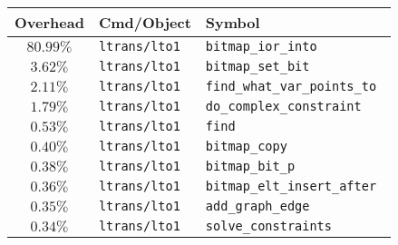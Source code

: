 \begin{tabular}{|c|l|l|}\hline Overhead & Cmd/Object & Symbol \\  \hline
\hline $80.99\%$ & \tt ltrans\hfill/lto1 & \tt bitmap\_ior\_into \\
\hline $3.62\%$ & \tt ltrans\hfill/lto1 & \tt bitmap\_set\_bit \\
\hline $2.11\%$ & \tt ltrans\hfill/lto1 & \tt find\_what\_var\_points\_to \\
\hline $1.79\%$ & \tt ltrans\hfill/lto1 & \tt do\_complex\_constraint \\
\hline $0.53\%$ & \tt ltrans\hfill/lto1 & \tt find \\
\hline $0.40\%$ & \tt ltrans\hfill/lto1 & \tt bitmap\_copy \\
\hline $0.38\%$ & \tt ltrans\hfill/lto1 & \tt bitmap\_bit\_p \\
\hline $0.36\%$ & \tt ltrans\hfill/lto1 & \tt bitmap\_elt\_insert\_after \\
\hline $0.35\%$ & \tt ltrans\hfill/lto1 & \tt add\_graph\_edge \\
\hline $0.34\%$ & \tt ltrans\hfill/lto1 & \tt solve\_constraints \\
\hline \end{tabular}
